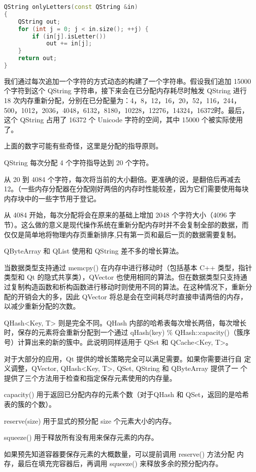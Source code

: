 \begin{lstlisting}[language=C++]
QString onlyLetters(const QString &in)
{
    QString out;
    for (int j = 0; j < in.size(); ++j) {
        if (in[j].isLetter())
            out += in[j];
    }
    return out;
}
\end{lstlisting}

我们通过每次追加一个字符的方式动态的构建了一个字符串。假设我们追加 15000 个字符到这个 QString 字符串，接下来会在已分配内存耗尽时触发 QString 进行 18 次内存重新分配，分别在已分配量为：4，8，12，16，20，52，116，244，500，1012，2036，4048，6132，8180，10228，12276，14324，16372时。最后，这个 QString 占用了 16372 个 Unicode 字符的空间，其中 15000 个被实际使用了。

上面的数字可能有些奇怪，这里是分配的指导原则。

\begin{compactitem}[\arr]
\item QString 每次分配 4 个字符指导达到 20 个字符。
\item 从 20 到 4084 个字符，每次将当前的大小翻倍。更准确的说，是翻倍后再减去 12。（一些内存分配器在分配刚好两倍的内存时性能较差，因为它们需要使用每块内存块中的一些字节用于登记。
\item 从 4084 开始，每次分配将会在原来的基础上增加 2048 个字符大小（4096 字节）。这么做的意义是现代操作系统在重新分配内存时并不会复制全部的数据，而仅仅是简单地将物理内存页重新排序,只有第一页和最后一页的数据需要复制。
\end{compactitem}

QByteArray 和 QList 使用和 QString 差不多的增长算法。

当数据类型支持通过 memcpy() 在内存中进行移动时（包括基本 C++ 类型，指针类型和 Qt 的隐式共享类），QVector 也使用相同的算法。但在数据类型只支持通过复制构造函数和析构函数进行移动时则使用不同的算法。在这种情况下，重新分配的开销会大的多，因此 QVector 将总是会在空间耗尽时直接申请两倍的内存，以减少重新分配的次数。

QHash<Key, T> 则是完全不同。QHash 内部的哈希表每次增长两倍，每次增长时，保存的元素将会重新分配到一个通过 qHash(key) \% QHash::capacity()（簇序号）计算出来的新的簇中。此说明同样适用于 QSet 和 QCache<Key, T>。

对于大部分的应用，Qt 提供的增长策略完全可以满足需要。如果你需要进行自
定义调整，QVector, QHash<Key, T>, QSet, QString 和 QByteArray 提供了一
个提供了三个方法用于检查和指定保存元素使用的内存量。

\begin{compactitem}[\arr]
\item capacity() 用于返回已分配内存的元素个数（对于QHash 和 QSet，返回的是哈希表的簇的个数）。
\item reserve(size) 用于显式的预分配 size 个元素大小的内存。
\item squeeze() 用于释放所有没有用来保存元素的内存。
\end{compactitem}

如果预先知道容器要保存元素的大概数量，可以提前调用 reserve() 方法分配
内存，最后在填充完容器后，再调用 squeeze() 来释放多余的预分配内存。